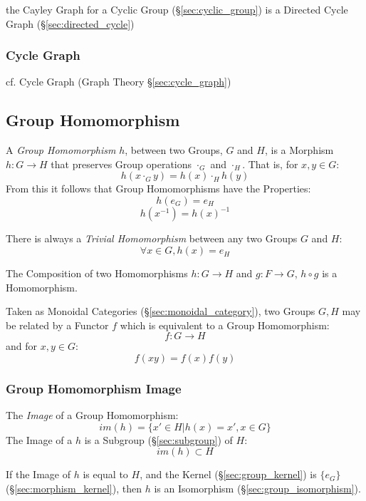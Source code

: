 the Cayley Graph for a Cyclic Group (\S\ref{sec:cyclic_group}) is a Directed
Cycle Graph (\S\ref{sec:directed_cycle})



\subsubsection{Cycle Graph}\label{sec:group_cycle_graph}

cf. Cycle Graph (Graph Theory \S\ref{sec:cycle_graph})



\subsection{Group Homomorphism}\label{sec:group_homomorphism}

A \emph{Group Homomorphism} $h$, between two Groups, $G$ and $H$, is a
Morphism $h : G \rightarrow H$ that preserves Group operations
$\cdot_G$ and $\cdot_H$. That is, for $x,y \in G$:
\[
    h(x \cdot_G y) = h(x) \cdot_H h(y)
\]
From this it follows that Group Homomorphisms have the Properties:
\[
    h(e_G) = e_H
\]\[
    h(x^{-1}) = h(x)^{-1}
\]

There is always a \emph{Trivial Homomorphism} between any two Groups
$G$ and $H$:
\[
    \forall x \in G, h (x) = e_H
\]

The Composition of two Homomorphisms $h : G \rightarrow H$ and $g : F
\rightarrow G$, $h \circ g$ is a Homomorphism.

Taken as Monoidal Categories (\S\ref{sec:monoidal_category}), two
Groups $G, H$ may be related by a Functor $f$ which is equivalent to a
Group Homomorphism:
\[
    f : G \rightarrow H
\]
and for $x,y \in G$:
\[
    f(xy) = f(x)f(y)
\]



\subsubsection{Group Homomorphism Image}\label{sec:group_image}

The \emph{Image} of a Group Homomorphism:
\[
    im(h) = \{ x' \in H | h(x) = x', x \in G \}
\]
The Image of a $h$ is a Subgroup (\S\ref{sec:subgroup}) of $H$:
\[
    im(h) \subset H
\]

If the Image of $h$ is equal to $H$, and the Kernel
(\S\ref{sec:group_kernel}) is $\{e_G\}$ (\S\ref{sec:morphism_kernel}),
then $h$ is an Isomorphism (\S\ref{sec:group_isomorphism}).



